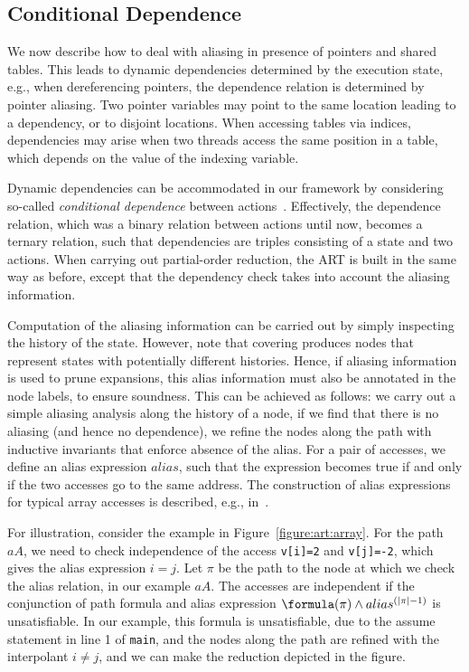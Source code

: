 \documentclass[conference]{IEEEtran}
\begin{document}
\subsection{Conditional Dependence}

We now describe how to deal with aliasing in presence
of pointers and shared tables. 
This leads to dynamic dependencies determined by the execution state, e.g., when
dereferencing pointers, the dependence relation is determined by pointer
aliasing. Two pointer variables may point to
the same location leading to a dependency, or to disjoint
locations.  When accessing tables via indices, dependencies may arise when
two threads access the same position in a table, which depends on the value
of the indexing variable.

Dynamic dependencies can be accommodated in our framework by considering
so-called \emph{conditional dependence} between
actions~\cite{DBLP:books/sp/Godefroid96}.  Effectively, the dependence
relation, which was a binary relation between actions until now, becomes a
ternary relation, such that dependencies are triples consisting of a state
and two actions.  When carrying out partial-order reduction, 
the ART is built in the same way as
before, except that the dependency check takes into account the aliasing
information.

Computation of the aliasing information can be carried out by simply
inspecting the history of the state.  However, note that 
covering produces nodes that represent states with potentially different
histories. Hence, if aliasing information is used to prune expansions, this alias information 
must also be annotated in the node labels, to ensure soundness.
This can be achieved as follows:
we carry out a simple aliasing analysis along the
history of a node, if we find that there is no aliasing (and hence no
dependence), we refine the nodes along the path with inductive invariants
that enforce absence of the alias.
For a pair of accesses, we define an alias expression $alias$,
such that the expression becomes true if and only if the
two accesses go to the same address.
The construction of alias expressions for typical
array accesses is described, e.g., in~\cite{DBLP:conf/tacas/WangYKG08}.

For illustration, consider the example in Figure~\ref{figure:art:array}.
For the path $aA$, we need to check independence of the access
\texttt{v[i]=2} and \texttt{v[j]=-2}, which gives the 
alias expression $i=j$.
Let $\pi$ be the path to the node at which we check the alias relation, in our example $aA$.
The accesses are independent if 
the conjunction of path formula and alias expression $\formula(\pi) \wedge alias^{(|\pi|-1)}$
is unsatisfiable.
In our example, this formula is unsatisfiable, due to the assume statement in line 1 of \texttt{main},
and the nodes along the path are refined with the 
interpolant $i\neq j$, and we can make the reduction depicted in the figure.
\end{document}
